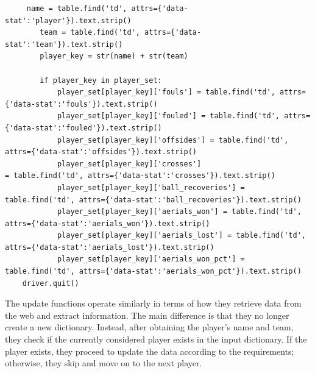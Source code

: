 \documentclass[12pt]{report}
\begin{document}
{\begin{lstlisting}
     name = table.find('td', attrs={'data-stat':'player'}).text.strip()
        team = table.find('td', attrs={'data-stat':'team'}).text.strip()
        player_key = str(name) + str(team)

        if player_key in player_set:
            player_set[player_key]['fouls'] = table.find('td', attrs={'data-stat':'fouls'}).text.strip()
            player_set[player_key]['fouled'] = table.find('td', attrs={'data-stat':'fouled'}).text.strip()
            player_set[player_key]['offsides'] = table.find('td', attrs={'data-stat':'offsides'}).text.strip()
            player_set[player_key]['crosses']
= table.find('td', attrs={'data-stat':'crosses'}).text.strip()
            player_set[player_key]['ball_recoveries'] = table.find('td', attrs={'data-stat':'ball_recoveries'}).text.strip()
            player_set[player_key]['aerials_won'] = table.find('td', attrs={'data-stat':'aerials_won'}).text.strip()
            player_set[player_key]['aerials_lost'] = table.find('td', attrs={'data-stat':'aerials_lost'}).text.strip()
            player_set[player_key]['aerials_won_pct'] = table.find('td', attrs={'data-stat':'aerials_won_pct'}).text.strip()
    driver.quit()

\end{lstlisting}
The update functions operate similarly in terms of how they retrieve data from the web and extract information. The main difference is that they no longer create a new dictionary. Instead, after obtaining the player's name and team, they check if the currently considered player exists in the input dictionary. If the player exists, they proceed to update the data according to the requirements; otherwise, they skip and move on to the next player.

}
\end{document}
